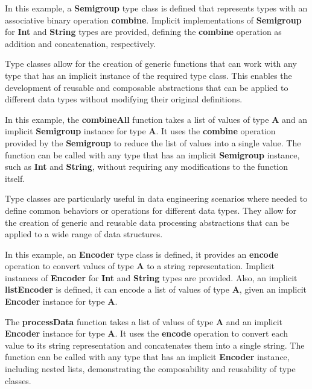 

In this example, a \textbf{Semigroup} type class is defined that represents types with an associative binary operation \textbf{combine}. Implicit implementations of \textbf{Semigroup} for \textbf{Int} and \textbf{String} types are provided, defining the \textbf{combine} operation as addition and concatenation, respectively.

Type classes allow for the creation of generic functions that can work with any type that has an implicit instance of the required type class. This enables the development of reusable and composable abstractions that can be applied to different data types without modifying their original definitions.



In this example, the \textbf{combineAll} function takes a list of values of type \textbf{A} and an implicit \textbf{Semigroup} instance for type \textbf{A}. It uses the \textbf{combine} operation provided by the \textbf{Semigroup} to reduce the list of values into a single value. The function can be called with any type that has an implicit \textbf{Semigroup} instance, such as \textbf{Int} and \textbf{String}, without requiring any modifications to the function itself.

Type classes are particularly useful in data engineering scenarios where needed to define common behaviors or operations for different data types. They allow for the creation of generic and reusable data processing abstractions that can be applied to a wide range of data structures.



In this example, an \textbf{Encoder} type class is defined, it provides an \textbf{encode} operation to convert values of type \textbf{A} to a string representation. Implicit instances of \textbf{Encoder} for \textbf{Int} and \textbf{String} types are provided. Also, an implicit \textbf{listEncoder} is defined, it can encode a list of values of type \textbf{A}, given an implicit \textbf{Encoder} instance for type \textbf{A}.

The \textbf{processData} function takes a list of values of type \textbf{A} and an implicit \textbf{Encoder} instance for type \textbf{A}. It uses the \textbf{encode} operation to convert each value to its string representation and concatenates them into a single string. The function can be called with any type that has an implicit \textbf{Encoder} instance, including nested lists, demonstrating the composability and reusability of type classes.

